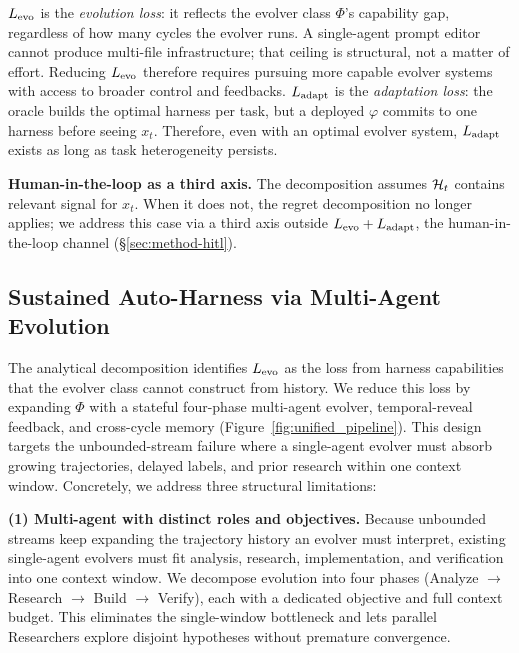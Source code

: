 $L_{\text{evo}}$ is the \emph{evolution loss}: it reflects the evolver class $\Phi$'s capability gap, regardless of how many cycles the evolver runs. A single-agent prompt editor cannot produce multi-file infrastructure; that ceiling is structural, not a matter of effort. Reducing $L_{\text{evo}}$ therefore requires pursuing more capable evolver systems with access to broader control and feedbacks. $L_{\text{adapt}}$ is the \emph{adaptation loss}: the oracle builds the optimal harness per task, but a deployed $\varphi$ commits to one harness before seeing $x_t$. Therefore, even with an optimal evolver system, $L_{\text{adapt}}$ exists as long as task heterogeneity persists.


\noindent\textbf{Human-in-the-loop as a third axis.}
The decomposition assumes $\mathcal{H}_t$ contains relevant signal for $x_t$. When it does not, the regret decomposition no longer applies; we address this case via a third axis outside $L_{\text{evo}} + L_{\text{adapt}}$, the human-in-the-loop channel (\S\ref{sec:method-hitl}).


\subsection{Sustained Auto-Harness via Multi-Agent Evolution}
\label{sec:method-multi}

The analytical decomposition identifies $L_{\text{evo}}$ as the loss from harness capabilities that the evolver class cannot construct from history. We reduce this loss by expanding $\Phi$ with a stateful four-phase multi-agent evolver, temporal-reveal feedback, and cross-cycle memory (Figure~\ref{fig:unified_pipeline}). This design targets the unbounded-stream failure where a single-agent evolver must absorb growing trajectories, delayed labels, and prior research within one context window. Concretely, we address three structural limitations:

\noindent\textbf{(1) Multi-agent with distinct roles and objectives.}
Because unbounded streams keep expanding the trajectory history an evolver must interpret, existing single-agent evolvers must fit analysis, research, implementation, and verification into one context window. We decompose evolution into four phases (Analyze $\to$ Research $\to$ Build $\to$ Verify), each with a dedicated objective and full context budget. This eliminates the single-window bottleneck and lets parallel Researchers explore disjoint hypotheses without premature convergence.

